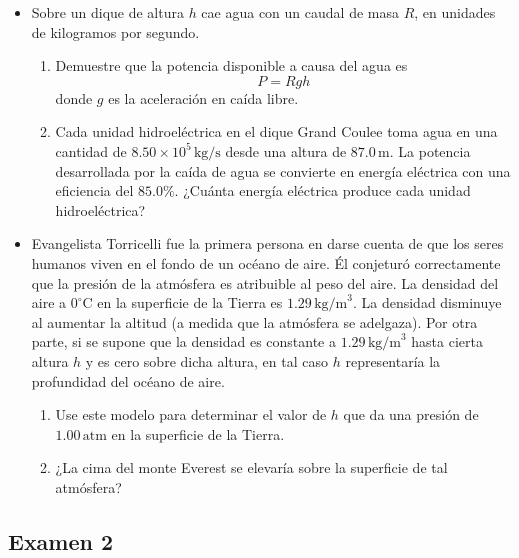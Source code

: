 \documentclass[11pt,a4paper]{article}
\begin{document}
\begin{itemize}
    \item[\textbf{3.}] Sobre un dique de altura \(h\) cae agua con un caudal de masa \(R\), en unidades de kilogramos por segundo.
    \begin{enumerate}
        \item[\textbf{(a)}] Demuestre que la potencia disponible a causa del agua es
        \[
        P = Rgh
        \]
        donde \(g\) es la aceleración en caída libre.
        \item[\textbf{(b)}] Cada unidad hidroeléctrica en el dique Grand Coulee toma agua en una cantidad de \(8.50 \times 10^5\,\text{kg/s}\) desde una altura de \(87.0\,\text{m}\). La potencia desarrollada por la caída de agua se convierte en energía eléctrica con una eficiencia del \(85.0\%\). ¿Cuánta energía eléctrica produce cada unidad hidroeléctrica?
    \end{enumerate}
    \vspace*{7cm}
    
    \item[\textbf{4.}] Evangelista Torricelli fue la primera persona en darse cuenta de que los seres humanos viven en el fondo de un océano de aire. Él conjeturó correctamente que la presión de la atmósfera es atribuible al peso del aire. La densidad del aire a \(0^\circ\text{C}\) en la superficie de la Tierra es \(1.29\,\text{kg/m}^3\). La densidad disminuye al aumentar la altitud (a medida que la atmósfera se adelgaza). Por otra parte, si se supone que la densidad es constante a \(1.29\,\text{kg/m}^3\) hasta cierta altura \(h\) y es cero sobre dicha altura, en tal caso \(h\) representaría la profundidad del océano de aire.
    \begin{enumerate}
        \item[\textbf{(a)}] Use este modelo para determinar el valor de \(h\) que da una presión de \(1.00\,\text{atm}\) en la superficie de la Tierra.
        \item[\textbf{(b)}] ¿La cima del monte Everest se elevaría sobre la superficie de tal atmósfera?
    \end{enumerate}
    \vspace*{7cm}
\end{itemize}

\newpage

\subsection*{Examen 2}
\end{document}
